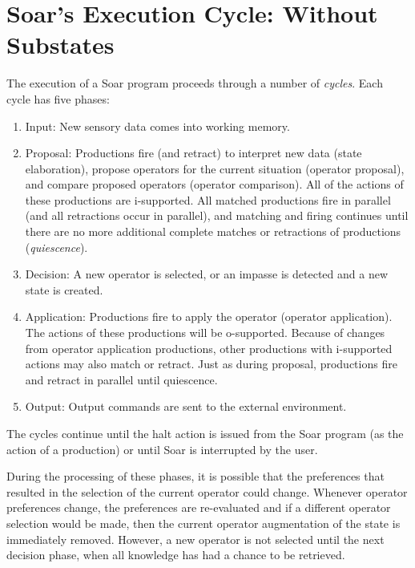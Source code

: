 \section{Soar's Execution Cycle: Without Substates}
\label{ARCH-decision}

The execution of a Soar program proceeds through a number of
\emph{cycles}. Each cycle has five phases:
\begin{enumerate} 
\item Input: New sensory data comes into working memory.
\item Proposal: Productions fire (and retract) to interpret new data (state 
elaboration), propose operators for the current situation (operator
proposal), and compare proposed operators (operator comparison).  All of
the actions of these productions are i-supported.  All matched
productions fire in parallel (and all retractions occur in parallel),
and matching and firing continues until there are no more additional
complete matches or retractions of productions (\emph{quiescence}).
\item Decision: A new operator is selected, or an impasse is detected
and a new state is created.
\item Application: Productions fire to apply the operator (operator
application).  The actions of these productions will be o-supported.
Because of changes from operator application productions, other
productions with i-supported actions may also match or retract. Just as
during proposal, productions fire and retract in parallel until quiescence.
\item Output: Output commands are sent to the external environment.
\end{enumerate}

The cycles continue until the halt action is issued from
the Soar program (as the action of a production) or until Soar is interrupted 
by the user.

During the processing of these phases, it is possible that the
preferences that resulted in the selection of the current operator could
change.  Whenever operator preferences change, the preferences are
re-evaluated and if a different operator selection would be made, then
the current operator augmentation of the state is immediately removed.
However, a new operator is not selected until the next decision phase, when
all knowledge has had a chance to be retrieved.

